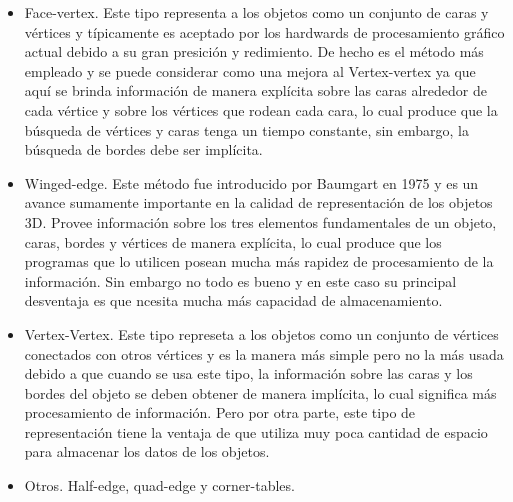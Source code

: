 \documentclass[11pt,letterpaper]{article}     %
\begin{document}
\begin{itemize}
	\item Face-vertex.
	Este tipo representa a los objetos como un conjunto de caras y v\' ertices y t\' ipicamente es aceptado por los hardwards de procesamiento gr\' afico actual debido a su gran presici\' on y redimiento. De hecho es el m\' etodo m\' as empleado y se puede considerar como una mejora al Vertex-vertex ya que aqu\' i se brinda informaci\' on de manera expl\' icita sobre las caras alrededor de cada v\' ertice y sobre los v\' ertices que rodean cada cara, lo cual produce que la b\' usqueda de v\' ertices y caras tenga un tiempo constante, sin embargo, la b\' usqueda de bordes debe ser impl\' icita.
	\item Winged-edge.
	Este m\' etodo fue introducido por Baumgart en 1975 \cite{Baumgart} y es un avance sumamente importante en la calidad de representaci\' on de los objetos 3D. Provee informaci\' on sobre los tres elementos fundamentales de un objeto, caras, bordes y v\' ertices de manera expl\' icita, lo cual produce que los programas que lo utilicen posean mucha m\' as rapidez de procesamiento de la informaci\' on. Sin embargo no todo es bueno y en este caso su principal desventaja es que ncesita mucha m\' as capacidad de almacenamiento.
	
	\item Vertex-Vertex.
	Este tipo represeta a los objetos como un conjunto de v\' ertices conectados con otros v\' ertices y es la manera m\' as simple pero no la m\' as usada debido a que cuando se usa este tipo, la informaci\' on sobre las caras y los bordes del objeto se deben obtener de manera impl\' icita, lo cual significa m\' as procesamiento de informaci\' on. 
	Pero por otra parte, este tipo de representaci\' on tiene la ventaja de que utiliza muy poca cantidad de espacio para almacenar los datos de los objetos.
	
	\item Otros. Half-edge, quad-edge y  corner-tables.
	
\end{itemize}

\end{document}

